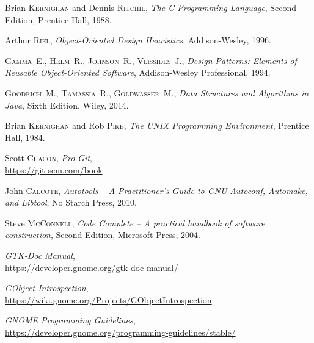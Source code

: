 \begin{thebibliography}{10}

Brian \textsc{Kernighan} and Dennis \textsc{Ritchie},
\emph{The C Programming Language},
Second Edition, Prentice Hall, 1988.

\medskip
{}
Arthur \textsc{Riel},
\emph{Object-Oriented Design Heuristics},
Addison-Wesley, 1996.

\medskip
{}
\textsc{Gamma}~E., \textsc{Helm}~R., \textsc{Johnson}~R., \textsc{Vlissides}~J.,
\emph{Design Patterns: Elements of Reusable Object-Oriented Software},
Addison-Wesley Professional, 1994.

\medskip
{}
\textsc{Goodrich}~M., \textsc{Tamassia}~R., \textsc{Goldwasser}~M.,
\emph{Data Structures and Algorithms in Java},
Sixth Edition, Wiley, 2014.

\medskip
{}
Brian \textsc{Kernighan} and Rob \textsc{Pike},
\emph{The UNIX Programming Environment},
Prentice Hall, 1984.

\medskip
{}
Scott \textsc{Chacon},
\emph{Pro Git},\\
\url{https://git-scm.com/book}

\medskip
{}
John \textsc{Calcote},
\emph{Autotools -- A Practitioner's Guide to GNU Autoconf, Automake, and Libtool},
No Starch Press, 2010.

\medskip
{}
Steve \textsc{McConnell},
\emph{Code Complete -- A practical handbook of software construction},
Second Edition, Microsoft Press, 2004.

\medskip
{}
\emph{GTK-Doc Manual},\\
\url{https://developer.gnome.org/gtk-doc-manual/}

\medskip
{}
\emph{GObject Introspection},\\
\url{https://wiki.gnome.org/Projects/GObjectIntrospection}

\medskip
{}
\emph{GNOME Programming Guidelines},\\
\url{https://developer.gnome.org/programming-guidelines/stable/}

\end{thebibliography}
